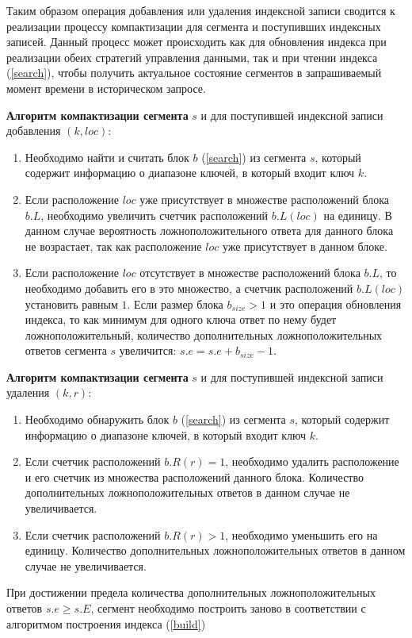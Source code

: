 Таким образом операция добавления или удаления индексной записи сводится к реализации процессу компактизации для сегмента и поступивших индексных записей. Данный процесс может происходить как для обновления индекса при реализации обеих стратегий управления данными, так и при чтении индекса (\ref{search}), чтобы получить актуальное состояние сегментов в запрашиваемый момент времени в историческом запросе.

\textbf{Алгоритм компактизации сегмента} $s$ и для поступившей индексной записи добавления $(k, loc)$:
\begin{enumerate}
\item Необходимо найти и считать блок $b$ (\ref{search}) из сегмента $s$, который содержит информацию о диапазоне ключей, в который входит ключ $k$.
\item Если расположение $loc$ уже присутствует в множестве расположений блока $b.L$, необходимо увеличить счетчик расположений $b.L(loc)$ на единицу. В данном случае вероятность ложноположительного ответа для данного блока не возрастает, так как расположение $loc$ уже присутствует в данном блоке.
\item Если расположение $loc$ отсутствует в множестве расположений блока $b.L$, то необходимо добавить его в это множество, а счетчик расположений $b.L(loc)$ установить равным $1$. Если размер блока $b_{size} > 1$ и это операция обновления индекса, то как минимум для одного ключа ответ по нему будет ложноположительный, количество дополнительных ложноположительных ответов сегмента $s$ увеличится: $s.e = s.e + b_{size} - 1$.   
\end{enumerate}

\textbf{Алгоритм компактизации сегмента} $s$ и для поступившей индексной записи удаления $(k, r)$:
\begin{enumerate}
\item Необходимо обнаружить блок $b$ (\ref{search}) из сегмента $s$, который содержит информацию о диапазоне ключей, в который входит ключ $k$.
\item Если счетчик расположений $b.R(r) = 1$, необходимо удалить расположение и его счетчик из множества расположений данного блока. Количество дополнительных ложноположительных ответов в данном случае не увеличивается.
\item Если счетчик расположений $b.R(r) > 1$, необходимо уменьшить его на единицу. Количество дополнительных ложноположительных ответов в данном случае не увеличивается.
\end{enumerate}

При достижении предела количества дополнительных ложноположительных ответов $s.e \geq s.E$, сегмент необходимо построить заново в соответствии с алгоритмом построения индекса (\ref{build})